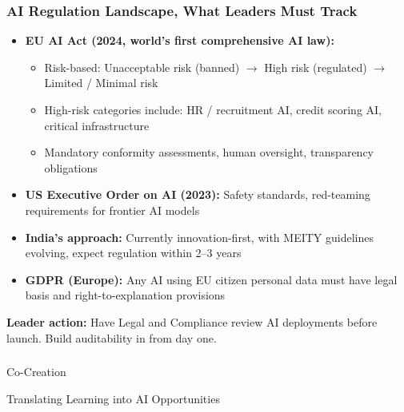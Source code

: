 \begin{frame}[fragile]\frametitle{AI Regulation Landscape, What Leaders Must Track}

\begin{itemize}
  \item \textbf{EU AI Act (2024, world's first comprehensive AI law):}
    \begin{itemize}
      \item Risk-based: Unacceptable risk (banned) $\rightarrow$ High risk (regulated) $\rightarrow$ Limited / Minimal risk
      \item High-risk categories include: HR / recruitment AI, credit scoring AI, critical infrastructure
      \item Mandatory conformity assessments, human oversight, transparency obligations
    \end{itemize}
  \item \textbf{US Executive Order on AI (2023):} Safety standards, red-teaming requirements for frontier AI models
  \item \textbf{India's approach:} Currently innovation-first, with MEITY guidelines evolving, expect regulation within 2--3 years
  \item \textbf{GDPR (Europe):} Any AI using EU citizen personal data must have legal basis and right-to-explanation provisions
\end{itemize}

\textbf{Leader action:} Have Legal and Compliance review AI deployments before launch. Build auditability in from day one.

\end{frame}


\begin{frame}[fragile]\frametitle{}
\begin{center}
{\Large Co-Creation}

{\small Translating Learning into AI Opportunities}
\end{center}
\end{frame}


